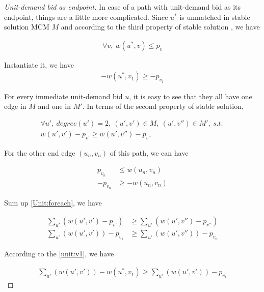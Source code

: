 \documentclass[11pt,a4paper]{article}
\begin{document}
\begin{proof}[Unit-demand bid as endpoint]

    In case of a path with unit-demand bid as its endpoint, things are a
    little more complicated. Since $u^{*}$ is unmatched in stable solution
    MCM $M$ and according to the third property of stable solution , we have
    
    \begin{align} 
        \forall v,\ w(u^{*}, v) \leq p_{v}
    \end{align}

    Instantiate it, we have 
    \begin{align}  \label{unit:v1}
         - w(u^{*}, v_1) \geq - p_{v_1} 
    \end{align}

    For every immediate unit-demand bid $u$, it is easy to see that they all
    have one edge in $M$ and one in $M'$. In terms of the second property of
    stable solution, 

    \begin{align} \label{Unit:foreach}
        \forall u',\ degree(u') = 2,\ (u', v') \in M,\ (u', v'') \in M',\
        s.t.\  \\
        w(u',v') - p_{v'} \geq w(u', v'') - p_{v''}
    \end{align}

    For the other end edge $(u_{n}, v_{n})$ of this path, we can have 

    \begin{align} 
        p_{v_{n}} &\leq w(u_{n}, v_{n}) \\
        - p_{v_{n}} &\geq - w(u_{n}, v_{n})  \label{unit:vn}
    \end{align}

    Sum up \eqref{Unit:foreach}, we have

    \begin{align}
        \sum_{u'} (w(u',v') - p_{v'}) & \geq \sum_{u'} (w(u', v'') - p_{v''}) \\
        \sum_{u'} (w(u',v')) - p_{v_1} & \geq 
        \sum_{u'} (w(u', v'')) - p_{v_{n}}   \label{unit:origin}
    \end{align}

    According to the \eqref{unit:v1}, we have 

    \begin{align} \label{unit:derive1}
       \sum_{u'} (w(u',v')) - w(u^{*}, v_1) \geq \sum_{u'} (w(u',v')) - p_{v_1} 
    \end{align}


\end{proof}
\end{document}
